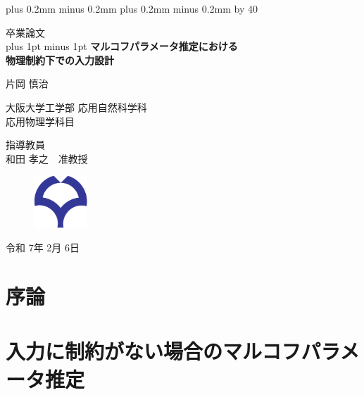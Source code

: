 \documentclass[a4paper,12pt,oneside,openany]{jsbook}
\def\kcharparline#1{%
   \ifx\xkanjiskip\undefined%
   \jintercharskip 0mm plus 0.2mm minus 0.2mm
   \else
   \xkanjiskip 0mm plus 0.2mm minus 0.2mm
   \fi
   \settowidth{\textwidth}{あ}%
   \multiply\textwidth by #1}
\begin{document}
\kcharparline{40} %


\begin{titlepage}
\begin{center}
	{\Large 卒業論文\\}
	\vspace{ 5mm }
	\baselineskip 35pt plus 1pt minus 1pt
	{\bf {\huge マルコフパラメータ推定における \\物理制約下での入力設計}}
	
	\vspace{ 30mm }
	{\LARGE 片岡 慎治 \\}
	
	\vspace{ 10mm }
	{\large 大阪大学工学部 応用自然科学科\\}
	{\large 応用物理学科目\\}
	
	\vspace{ 10mm }
	{\large 指導教員\\}
	{\large 和田 孝之　准教授 \\}
	
	\vspace{ 5mm }
	\begin{figure}[h]
	\centering
	\includegraphics[width=20mm]{osaka_logo.pdf}\\
	\end{figure}
	\vspace{ 5mm }
	{\large 令和 7年 2月 6日}
\end{center}
\end{titlepage}
\thispagestyle{empty}


\frontmatter

\tableofcontents

\mainmatter
% 
\chapter{序論}



\chapter{入力に制約がない場合のマルコフパラメータ推定}

\end{document}
